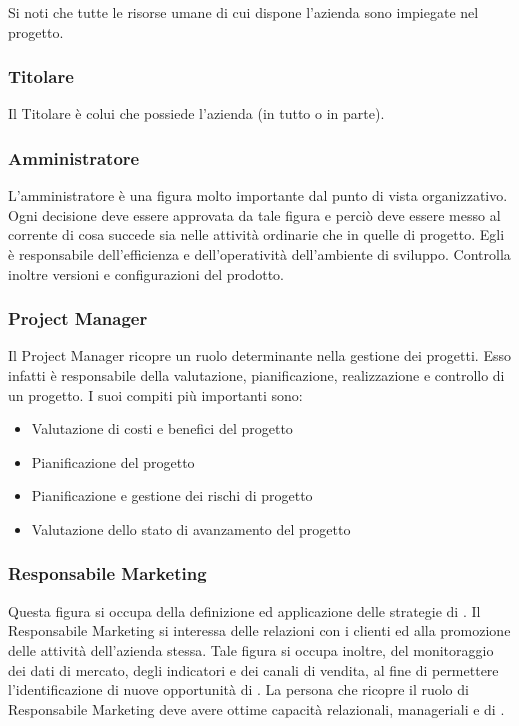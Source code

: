 Si noti che tutte le risorse umane di cui dispone l'azienda sono impiegate nel progetto.

	\subsubsection{Titolare}
	Il Titolare è colui che possiede l'azienda (in tutto o in parte).
	\subsubsection{Amministratore}		
	L'amministratore è una figura molto importante dal punto di vista organizzativo. Ogni decisione deve essere approvata da 	tale figura e perciò deve essere messo al corrente di cosa succede sia nelle attività ordinarie che in quelle di progetto.
	Egli è responsabile dell'efficienza e dell'operatività dell'ambiente di sviluppo. Controlla inoltre versioni e configurazioni del prodotto.
	\subsubsection{Project Manager}
	Il Project Manager ricopre un ruolo determinante nella gestione dei progetti. Esso infatti è responsabile della valutazione, pianificazione, realizzazione e controllo di un progetto.
	I suoi compiti più importanti sono:
	\begin{itemize}
		\item Valutazione di costi e benefici del progetto
		\item Pianificazione del progetto
		\item Pianificazione e gestione dei rischi di progetto
		\item Valutazione dello stato di avanzamento del progetto

	\end{itemize}

\subsubsection{Responsabile Marketing}
	Questa figura si occupa della definizione ed applicazione delle strategie di . Il Responsabile Marketing si interessa delle relazioni con i clienti ed alla promozione delle attività dell'azienda stessa. Tale figura si occupa inoltre, del monitoraggio dei dati di mercato, degli indicatori e dei canali di vendita, al fine di permettere l'identificazione di nuove opportunità di . La persona che ricopre il ruolo di Responsabile Marketing deve avere ottime capacità relazionali, manageriali e di . 
